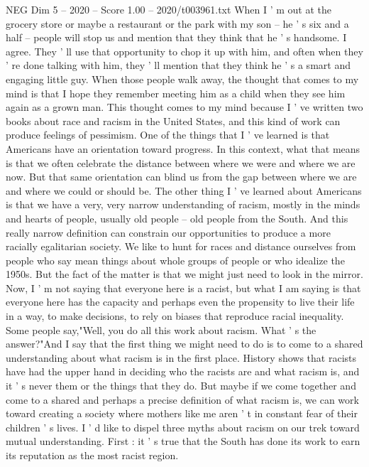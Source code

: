 \begin{textsample}{NEG Dim 5 – 2020 – Score 1.00 – 2020/t003961.txt}  \label{ex:f5_neg_021}
When I ' m out at the grocery store or maybe a restaurant or the park with my son -- he ' s six and a half -- people will stop us and mention that they think that he ' s handsome.
I agree.
They ' ll use that opportunity to chop it up with him, and often when they ' re done talking with him, they ' ll mention that they think he ' s a smart and engaging little guy.
When those people walk away, the thought that comes to my mind is that I hope they remember meeting him as a child when they see him again as a grown man.
This thought comes to my mind because I ' ve written two books about race and racism in the United States, and this kind of work can produce feelings of pessimism.
One of the things that I ' ve learned is that Americans have an orientation toward progress.
In this context, what that means is that we often celebrate the distance between where we were and where we are now.
But that same orientation can blind us from the gap between where we are and where we could or should be.
The other thing I ' ve learned about Americans is that we have a very, very narrow understanding of racism, mostly in the minds and hearts of people, usually old people -- old people from the South.
And this really narrow definition can constrain our opportunities to produce a more racially egalitarian society.
We like to hunt for races and distance ourselves from people who say mean things about whole groups of people or who idealize the 1950s.
But the fact of the matter is that we might just need to look in the mirror.
Now, I ' m not saying that everyone here is a racist, but what I am saying is that everyone here has the capacity and perhaps even the propensity to live their life in a way, to make decisions, to rely on biases that reproduce racial inequality.
Some people say,"Well, you do all this work about racism.
What ' s the answer?"And I say that the first thing we might need to do is to come to a shared understanding about what racism is in the first place.
History shows that racists have had the upper hand in deciding who the racists are and what racism is, and it ' s never them or the things that they do.
But maybe if we come together and come to a shared and perhaps a precise definition of what racism is, we can work toward creating a society where mothers like me aren ' t in constant fear of their children ' s lives.
I ' d like to dispel three myths about racism on our trek toward mutual understanding.
First : it ' s true that the South has done its work to earn its reputation as the most racist region.

\end{textsample}
